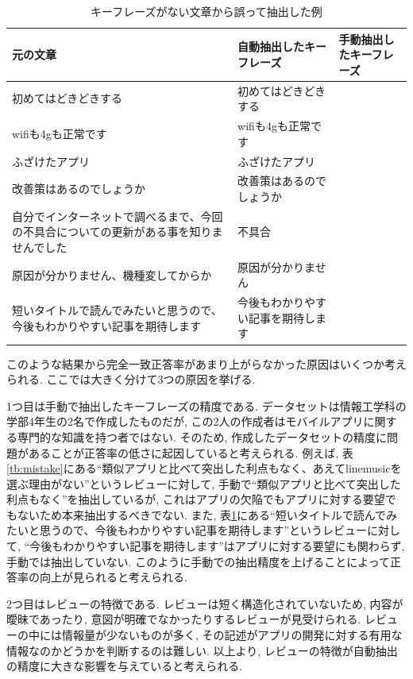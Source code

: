 \begin{table}[H]
  \caption{ キーフレーズがない文章から誤って抽出した例 }
  \label{tb:mistake2}
  \begin{center}
  \begin{tabularx}{\linewidth}{X|X|X}
    \hline
    元の文章&自動抽出したキーフレーズ&手動抽出したキーフレーズ\\\hline\hline
    初めてはどきどきする&初めてはどきどきする&\\\hline
    wifiも4gも正常です&wifiも4gも正常です&\\\hline
    ふざけたアプリ&ふざけたアプリ&\\\hline
    改善策はあるのでしょうか&改善策はあるのでしょうか&\\\hline
    自分でインターネットで調べるまで、今回の不具合についての更新がある事を知りませんでした&不具合&\\\hline
    原因が分かりません、機種変してからか&原因が分かりません&\\\hline
    短いタイトルで読んでみたいと思うので、今後もわかりやすい記事を期待します&今後もわかりやすい記事を期待します&\\\hline
  \end{tabularx}\end{center}
\end{table}

このような結果から完全一致正答率があまり上がらなかった原因はいくつか考えられる. ここでは大きく分けて3つの原因を挙げる. 

1つ目は手動で抽出したキーフレーズの精度である. データセットは情報工学科の学部4年生の2名で作成したものだが, この2人の作成者はモバイルアプリに関する専門的な知識を持つ者ではない. そのため, 作成したデータセットの精度に問題があることが正答率の低さに起因していると考えられる. 
例えば, 表\ref{tb:mistake}にある``類似アプリと比べて突出した利点もなく、あえてlinemusicを選ぶ理由がない''というレビューに対して, 手動で``類似アプリと比べて突出した利点もなく''を抽出しているが, これはアプリの欠陥でもアプリに対する要望でもないため本来抽出するべきでない. 
また, 表\ref{tb:mistake2}にある``短いタイトルで読んでみたいと思うので、今後もわかりやすい記事を期待します''というレビューに対して, ``今後もわかりやすい記事を期待します''はアプリに対する要望にも関わらず, 手動では抽出していない. このように手動での抽出精度を上げることによって正答率の向上が見られると考えられる. 

2つ目はレビューの特徴である. レビューは短く構造化されていないため, 内容が曖昧であったり, 意図が明確でなかったりするレビューが見受けられる. レビューの中には情報量が少ないものが多く, その記述がアプリの開発に対する有用な情報なのかどうかを判断するのは難しい. 
以上より, レビューの特徴が自動抽出の精度に大きな影響を与えていると考えられる. 

